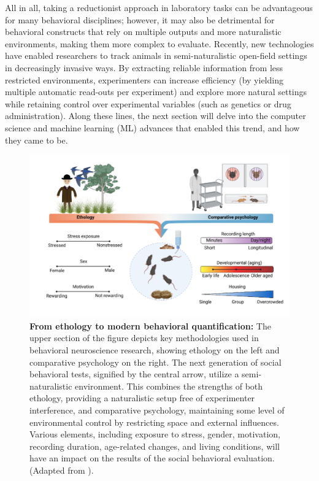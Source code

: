 All in all, taking a reductionist approach in laboratory tasks can be advantageous for many behavioral disciplines; however, it may also be detrimental for behavioral constructs that rely on multiple outputs and more naturalistic environments, making them more complex to evaluate. Recently, new technologies have enabled researchers to track animals in semi-naturalistic open-field settings in decreasingly invasive ways. By extracting reliable information from less restricted environments, experimenters can increase efficiency (by yielding multiple automatic read-outs per experiment) and explore more natural settings while retaining control over experimental variables (such as genetics or drug administration). Along these lines, the next section will delve into the computer science and machine learning (ML) advances that enabled this trend, and how they came to be.

\begin{figure}[!thb]
\centering
\includegraphics[width=\textwidth]{Figures/intro_2.pdf}

\caption[\textbf{From ethology to modern behavioral quantification}]{\textbf{From ethology to modern behavioral quantification:} The upper section of the figure depicts key methodologies used in behavioral neuroscience research, showing ethology on the left and comparative psychology on the right. The next generation of social behavioral tests, signified by the central arrow, utilize a semi-naturalistic environment. This combines the strengths of both ethology, providing a naturalistic setup free of experimenter interference, and comparative psychology, maintaining some level of environmental control by restricting space and external influences. Various elements, including exposure to stress, gender, motivation, recording duration, age-related changes, and living conditions, will have an impact on the results of the social behavioral evaluation. (Adapted from \cite{Bordes2023AdvancingLearning}).}
\label{fig:1.2}

\end{figure}

